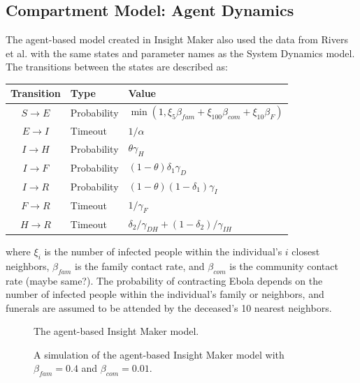 \documentclass[10pt]{article}
\begin{document}
%
%
%
%
%

\subsection{Compartment Model: Agent Dynamics}
The agent-based model created in Insight Maker also used the data from Rivers et al. with the same states and parameter names as the System Dynamics model. The transitions between the states are described as:\\

\begin{table}[ht]
\begin{center}
\begin{tabular}{c | l | l}
{\bf Transition} & {\bf Type } & {\bf Value}\\\hline
$S\rightarrow E$ & Probability & $\min(1,\xi_5\beta_{fam}+\xi_{100}\beta_{com}+\xi_{10}\beta_F)$\\
$E\rightarrow I$ & Timeout & $1/\alpha$\\
$I\rightarrow H$ & Probability & $\theta\gamma_H$\\
$I\rightarrow F$ & Probability & $(1-\theta)\delta_1\gamma_D$\\
$I\rightarrow R$ & Probability & $(1-\theta)(1-\delta_{1})\gamma_I$\\
$F\rightarrow R$ & Timeout & ${1}/{\gamma_{F}}$\\
$H\rightarrow R$ & Timeout & $\delta_{2}/{\gamma_{DH}} + (1-\delta_{2})/{\gamma_{IH}}$\\
\end{tabular}
\end{center}
\end{table}
\noindent where $\xi_{i}$ is the number of infected people within the individual's $i$ closest neighbors, $\beta_{fam}$ is the family contact rate, and $\beta_{com}$ is the community contact rate (maybe same?). The probability of contracting Ebola depends on the number of infected people within the individual's family or neighbors, and funerals are assumed to be attended by the deceased's 10 nearest neighbors.

\begin{figure}
\caption{The agent-based Insight Maker model.}
\end{figure}

\begin{figure}
\caption{A simulation of the agent-based Insight Maker model with $\beta_{fam}=0.4$ and $\beta_{com}=0.01$.}
\end{figure}
\end{document}
